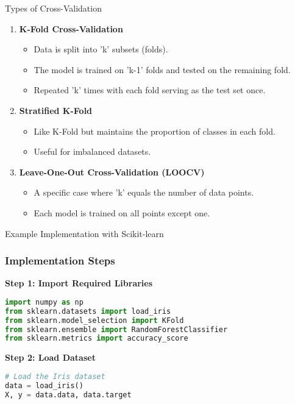 \documentclass[aspectratio=169]{beamer}
\begin{document}
\begin{frame}{Types of Cross-Validation}
    \begin{enumerate}
        \item \textbf{K-Fold Cross-Validation}
            \begin{itemize}
                \item Data is split into 'k' subsets (folds).
                \item The model is trained on 'k-1' folds and tested on the remaining fold.
                \item Repeated 'k' times with each fold serving as the test set once.
            \end{itemize}
            
        \item \textbf{Stratified K-Fold}
            \begin{itemize}
                \item Like K-Fold but maintains the proportion of classes in each fold.
                \item Useful for imbalanced datasets.
            \end{itemize}
        
        \item \textbf{Leave-One-Out Cross-Validation (LOOCV)}
            \begin{itemize}
                \item A specific case where 'k' equals the number of data points.
                \item Each model is trained on all points except one.
            \end{itemize}
    \end{enumerate}
\end{frame}

\begin{frame}[fragile]{Example Implementation with Scikit-learn}
    \frametitle{Implementation Steps}
    \textbf{Step 1: Import Required Libraries}
    \begin{lstlisting}[language=Python]
import numpy as np
from sklearn.datasets import load_iris
from sklearn.model_selection import KFold
from sklearn.ensemble import RandomForestClassifier
from sklearn.metrics import accuracy_score
    \end{lstlisting}
    
    \textbf{Step 2: Load Dataset}
    \begin{lstlisting}[language=Python]
# Load the Iris dataset
data = load_iris()
X, y = data.data, data.target
    \end{lstlisting}
\end{frame}
\end{document}
